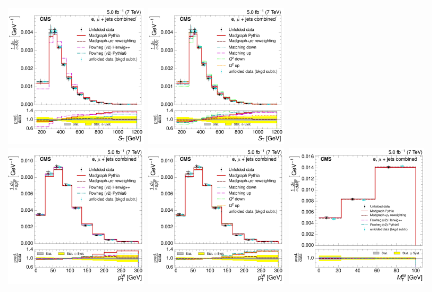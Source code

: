 \begin{figure}[hbtp]
     \includegraphics[width=0.32\textwidth]{Chapters/07_08_09_Analysis/Images/results/fit/7TeV/ST/central/normalised_xsection_combined_different_generators_with_bkgd_subtraction_results.pdf}\hfill
     \includegraphics[width=0.32\textwidth]{Chapters/07_08_09_Analysis/Images/results/fit/7TeV/ST/central/normalised_xsection_combined_systematics_shifts_with_bkgd_subtraction_results.pdf}\\
     \includegraphics[width=0.32\textwidth]{Chapters/07_08_09_Analysis/Images/results/fit/7TeV/WPT/central/normalised_xsection_combined_different_generators_with_bkgd_subtraction_results.pdf}\hfill
     \includegraphics[width=0.32\textwidth]{Chapters/07_08_09_Analysis/Images/results/fit/7TeV/WPT/central/normalised_xsection_combined_systematics_shifts_with_bkgd_subtraction_results.pdf}\hfill
     \includegraphics[width=0.32\textwidth]{Chapters/07_08_09_Analysis/Images/results/fit/7TeV/MT/central/normalised_xsection_combined_different_generators_with_bkgd_subtraction_results.pdf}\\

\end{figure}
